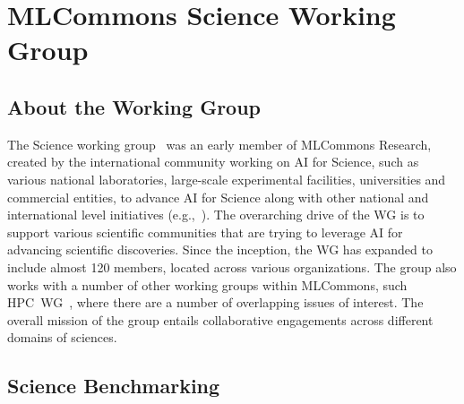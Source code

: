 \section{MLCommons Science Working Group}
\label{sec:science-wg}

\subsection{About the Working Group}
The Science working group~\cite{mlcommons-science} was an early member of MLCommons Research, created by the international community working on AI for Science, such as various national laboratories, large-scale experimental facilities, universities and commercial entities, to advance AI for Science along with other national and international level initiatives (e.g.,~\cite{ai4s-doe-report}). The overarching drive of the WG is to support various scientific communities that are trying to leverage AI for advancing scientific discoveries. Since the inception, the WG has expanded to include almost 120 members, located across various  organizations. The group also works with a number of other working groups within MLCommons, such HPC~WG~\cite{hpc-wg-arxiv}, where there are a number of overlapping issues of interest. The overall mission of the group entails collaborative engagements  across different domains of sciences. 

\subsection{Science Benchmarking}

